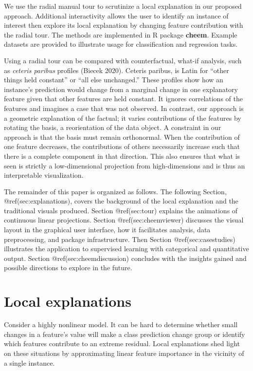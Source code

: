 \documentclass[
]{article}
\begin{document}
We use the radial manual tour to scrutinize a local explanation in our
proposed approach. Additional interactivity allows the user to identify
an instance of interest then explore its local explanation by changing
feature contribution with the radial tour. The methods are implemented
in R package \textbf{cheem}. Example datasets are provided to illustrate
usage for classification and regression tasks.

Using a radial tour can be compared with counterfactual, what-if
analysis, such as \emph{ceteris paribus} profiles (Biecek 2020). Ceteris
paribus, is Latin for ``other things held constant'' or ``all else
unchanged.'' These profiles show how an instance's prediction would
change from a marginal change in one explanatory feature given that
other features are held constant. It ignores correlations of the
features and imagines a case that was not observed. In contrast, our
approach is a geometric explanation of the factual; it varies
contributions of the features by rotating the basis, a reorientation of
the data object. A constraint in our approach is that the basis must
remain orthonormal. When the contribution of one feature decreases, the
contributions of others necessarily increase such that there is a
complete component in that direction. This also ensures that what is
seen is strictly a low-dimensional projection from high-dimensions and
is thus an interpretable visualization.

The remainder of this paper is organized as follows. The following
Section, @ref(sec:explanations), covers the background of the local
explanation and the traditional visuals produced. Section @ref(sec:tour)
explains the animations of continuous linear projections. Section
@ref(sec:cheemviewer) discusses the visual layout in the graphical user
interface, how it facilitates analysis, data preprocessing, and package
infrastructure. Then Section @ref(sec:casestudies) illustrates the
application to supervised learning with categorical and quantitative
output. Section @ref(sec:cheemdiscussion) concludes with the insights
gained and possible directions to explore in the future.

\hypertarget{sec:explanations}{%
\section{Local explanations}\label{sec:explanations}}

Consider a highly nonlinear model. It can be hard to determine whether
small changes in a feature's value will make a class prediction change
group or identify which features contribute to an extreme residual.
Local explanations shed light on these situations by approximating
linear feature importance in the vicinity of a single instance.
\end{document}

